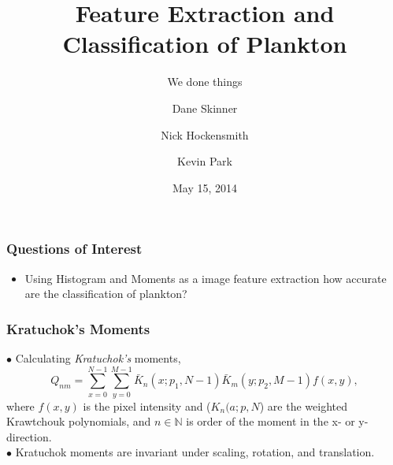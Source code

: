 \documentclass{beamer}
\title 
{Feature Extraction and Classification of Plankton}
\subtitle
{ We done things }
\author{Dane Skinner \and Nick Hockensmith \and Kevin Park}
\institute
{Oregon State University}
\date
{May 15, 2014}
\begin{document}
\begin{frame}
	\maketitle
\end{frame}


\begin{frame}
\frametitle{Questions of Interest}
\begin{itemize}
	\item Using Histogram and Moments as a image feature extraction how accurate are the classification of plankton?
\end{itemize}

\end{frame}


\begin{frame}
\frametitle{Kratuchok's Moments}
$\bullet$ Calculating \textit{Kratuchok's} moments,
\begin{equation*}
Q_{nm} = \sum_{x=0}^{N-1}\sum_{y=0}^{M-1}\bar{K}_n(x;p_1,N-1)\bar{K}_m(y;p_2,M-1)f(x,y),
\end{equation*}
where  $f(x,y)$ is the pixel intensity and ($K_n(a;p,N$) are the weighted Krawtchouk polynomials, and $n\in \mathbb{N}$ is order of the moment in the x- or y-direction.\\
$\bullet$ Kratuchok moments are invariant under scaling, rotation, and translation. \\
\end{frame}

\end{document}
